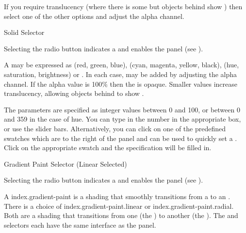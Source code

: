 If you require \gls{translucency} (where there is some 
but \glspl{object} behind show ) then select one of
the other  options and adjust the alpha channel.


{}
{Solid  Selector}

Selecting the  radio button indicates a
  and enables the
 panel (see ). 

A  may be expressed as
 (red, green, blue),
 (cyan, magenta, yellow, black),
 (hue, saturation, brightness) or
. In each case,
 may be added by adjusting
the alpha channel.  If the alpha value is 100\% then the
 is opaque.  Smaller values increase
\gls{translucency}, allowing \glspl{object} behind to show
.

The parameters are specified as integer values between 0 and 100,
or between 0 and 359 in the case of hue.
You can type in the number in the appropriate box, or use
the slider bars. Alternatively, you can click on one of the predefined swatches
which are to the right of the  panel 
and can be used to quickly set a . Click on the 
appropriate swatch and the  specification will be
filled in.


{}
{Gradient Paint Selector (Linear Selected)}

Selecting the  radio button indicates a 
 and enables the
 panel (see
). 

A \gls{index.gradient-paint} is a shading that smoothly transitions
from a  to an
.  There is a choice
of \gls{index.gradient-paint.linear} or
\gls{index.gradient-paint.radial}. Both are a shading that
transitions from one  (the
) to another (the
).  The
 and  selectors
each have the same interface as the  panel.

